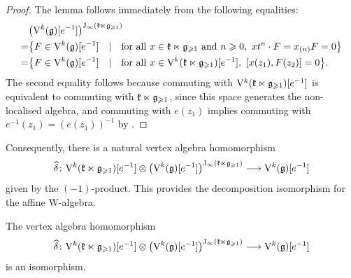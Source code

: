 \begin{proof}
	The lemma follows immediately from the following equalities:
	\[ \begin{aligned}
		& \big(\mathrm V^k(\mathfrak g)[e^{-1}] \big)^{\mathrm{J}_\infty(\mathfrak k \ltimes \mathfrak g_{\geqslant 1})} \\
		= & \big\{ F \in \mathrm V^k(\mathfrak g)[e^{-1}] \quad | \quad \text{for all} ~  x \in \mathfrak k \ltimes \mathfrak g_{\geqslant 1} ~\text{and} ~n \geqslant 0,  ~   xt^n \cdot F = x_{(n)} F = 0 \big\} \\
		= & \big\{ F \in \mathrm V^k(\mathfrak g)[e^{-1}] \quad | \quad \text{for all} ~  x \in \mathrm V^k(\mathfrak k \ltimes \mathfrak g_{\geqslant 1})[e^{-1}],  ~   [x(z_1), F(z_2)] = 0 \big\}. 
	\end{aligned} \]
	The second equality follows because commuting with $\mathrm V^k(\mathfrak k \ltimes \mathfrak g_{\geqslant 1})[e^{-1}]$ is equivalent to commuting with $\mathfrak k \ltimes \mathfrak g_{\geqslant 1}$, since this space generates the non-localised algebra, and commuting with $e(z_1)$ implies commuting with $e^{-1}(z_1) = (e(z_1))^{-1}$ by \cite[Formula (3.1)]{arakawa2026faithful}.
	
\end{proof}

Consequently, there is a natural vertex algebra homomorphism
\[ \widehat{\delta} \colon \mathrm V^k(\mathfrak k \ltimes \mathfrak g_{\geqslant 1})[e^{-1}] \otimes \big(\mathrm V^k(\mathfrak g)[e^{-1}]\big)^{\mathrm{J}_\infty(\mathfrak k \ltimes \mathfrak g_{\geqslant 1})} \longrightarrow \mathrm V^k(\mathfrak g)[e^{-1}] \]
given by the $(-1)$-product. This provides the decomposition isomorphism for the affine W-algebra.


\begin{theorem} \label{theorem:decomposition-chiral}
	The vertex algebra homomorphism
	\[ \widehat{\delta} \colon \mathrm V^k(\mathfrak k \ltimes \mathfrak g_{\geqslant 1})[e^{-1}] \otimes \big(\mathrm V^k(\mathfrak g)[e^{-1}]\big)^{\mathrm{J}_\infty(\mathfrak k \ltimes \mathfrak g_{\geqslant 1})} \longrightarrow \mathrm V^k(\mathfrak g)[e^{-1}] \]
	is an isomorphism.
\end{theorem}

